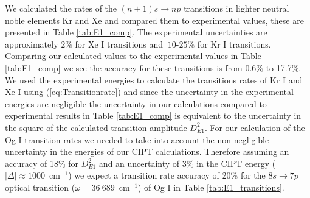 \documentclass[10pt,a4paper, twoside, openright]{report}
\begin{document}
We calculated the  rates of the $(n+1)s \rightarrow np$ transitions in lighter neutral noble elements Kr and Xe  and compared them to experimental values, these are presented in Table \ref{tab:E1_comp}. The experimental uncertainties are approximately $2\%$ for Xe I transitions \cite{Xe_BSD} and $~10$-$25\%$ for Kr I transitions\cite{Kr_BSD}. Comparing our calculated values to the experimental values in Table \ref{tab:E1_comp} we see the accuracy for these transitions is from 0.6\% to 17.7\%. We used the experimental energies to calculate the transitions rates of Kr I and Xe I using (\ref{eq:Transitionrate}) and since the uncertainty in the experimental energies are negligible the uncertainty in our calculations compared to experimental results in Table \ref{tab:E1_comp} is equivalent to the uncertainty in the square of the calculated transition amplitude $D_{E1}^2$. For our calculation of the Og I transition rates we needed to take into account the non-negligible uncertainty in the energies of our CIPT calculations.  Therefore assuming an accuracy of 18\% for $D_{E1}^2$ and an uncertainty of 3\% in the CIPT energy ($\left|\Delta\right| \approx 1000$~cm$^{-1}$) we expect a transition rate accuracy of 20\% for the $8s \rightarrow 7p$ optical transition ($\omega = 36~689$~cm$^{-1}$) of Og I in Table \ref{tab:E1_transitions}.  \\
\end{document}
